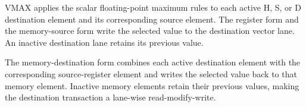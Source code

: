 VMAX applies the scalar floating-point maximum rules to each active H, S, or
D destination element and its corresponding source element. The register form
and the memory-source form write the selected value to the destination vector
lane. An inactive destination lane retains its previous value.

The memory-destination form combines each active destination element with the
corresponding source-register element and writes the selected value back to
that memory element. Inactive memory elements retain their previous values,
making the destination transaction a lane-wise read-modify-write.
